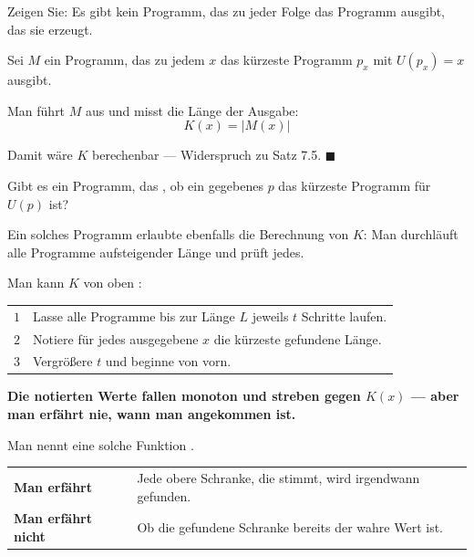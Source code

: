 \begin{aufgabe}
Zeigen Sie: Es gibt kein Programm, das zu jeder Folge das  Programm ausgibt, das sie erzeugt.

\loesung
{}
Sei $M$ ein Programm, das zu jedem $x$ das kürzeste Programm $p_x$ mit $U(p_x)=x$ ausgibt.

Man führt $M$ aus und misst die Länge der Ausgabe:
\[ K(x) = |M(x)| \]

Damit wäre $K$ berechenbar --- Widerspruch zu Satz 7.5. $\blacksquare$

Gibt es ein Programm, das , ob ein gegebenes $p$ das kürzeste Programm für $U(p)$ ist?

 Ein solches Programm erlaubte ebenfalls die Berechnung von $K$: Man durchläuft alle Programme aufsteigender Länge und prüft jedes.

Man kann $K$ von oben :

\begin{center}
{\small
\renewcommand{\arraystretch}{1.5}
\begin{tabular}{@{}P{1.0cm}P{7.4cm}@{}}
\toprule
$1$ & Lasse alle Programme bis zur Länge $L$ jeweils $t$ Schritte laufen.\\
$2$ & Notiere für jedes ausgegebene $x$ die kürzeste gefundene Länge.\\
$3$ & Vergrößere $t$ und beginne von vorn.\\
\bottomrule
\end{tabular}}
\end{center}

\begin{center}
\begin{minipage}{0.9\textwidth}
\textbf{Die notierten Werte fallen monoton und streben gegen $K(x)$ --- aber man erfährt nie, wann man angekommen ist.}
\end{minipage}
\end{center}

Man nennt eine solche Funktion .

\begin{center}
{\small
\renewcommand{\arraystretch}{1.5}
\begin{tabular}{@{}P{2.6cm}P{6.0cm}@{}}
\toprule
\textbf{Man erfährt} & Jede obere Schranke, die stimmt, wird irgendwann gefunden.\\
\textbf{Man erfährt nicht} & Ob die gefundene Schranke bereits der wahre Wert ist.\\
\bottomrule
\end{tabular}}
\end{center}


\end{aufgabe}
